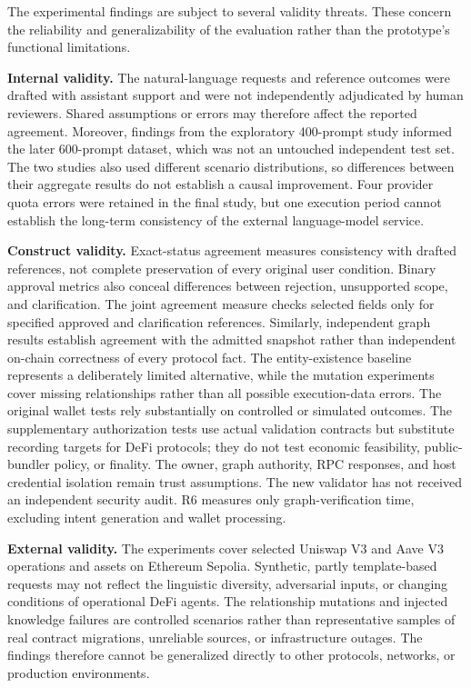 The experimental findings are subject to several validity threats. These
concern the reliability and generalizability of the evaluation rather than
the prototype's functional limitations.

\medskip\noindent\textbf{Internal validity.}
The natural-language requests and reference outcomes were drafted with
assistant support and were not independently adjudicated by human reviewers.
Shared assumptions or errors may therefore affect the reported agreement.
Moreover, findings from the exploratory 400-prompt study informed the later
600-prompt dataset, which was not an untouched independent test set. The two
studies also used different scenario distributions, so differences between
their aggregate results do not establish a causal improvement. Four provider
quota errors were retained in the final study, but one execution period cannot
establish the long-term consistency of the external language-model service.

\medskip\noindent\textbf{Construct validity.}
Exact-status agreement measures consistency with drafted references, not
complete preservation of every original user condition. Binary approval
metrics also conceal differences between rejection, unsupported scope, and
clarification. The joint agreement measure checks selected fields only for
specified approved and clarification references. Similarly, independent graph
results establish agreement with the admitted snapshot rather than independent
on-chain correctness of every protocol fact. The entity-existence baseline
represents a deliberately limited alternative, while the mutation experiments
cover missing relationships rather than all possible execution-data errors.
The original wallet tests rely substantially on controlled or simulated
outcomes. The supplementary authorization tests use actual validation
contracts but substitute recording targets for DeFi protocols; they do not
test economic feasibility, public-bundler policy, or finality. The owner,
graph authority, RPC responses, and host credential isolation remain trust
assumptions. The new validator has not received an independent security
audit. R6
measures only graph-verification time, excluding intent generation and wallet
processing.

\medskip\noindent\textbf{External validity.}
The experiments cover selected Uniswap V3 and Aave V3 operations and assets
on Ethereum Sepolia. Synthetic, partly template-based requests may not reflect
the linguistic diversity, adversarial inputs, or changing conditions of
operational DeFi agents. The relationship mutations and injected knowledge
failures are controlled scenarios rather than representative samples of real
contract migrations, unreliable sources, or infrastructure outages. The
findings therefore cannot be generalized directly to other protocols,
networks, or production environments.

